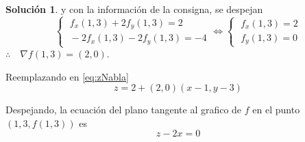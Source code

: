 \documentclass[10pt, a4paper]{report}
\theoremstyle{definition} %
\newtheorem{solution}{Solución}
\begin{document}
\begin{solution}
    y con la información de la consigna, se despejan
    \[\begin{cases}
            \;f_x(1,3) + 2f_y(1,3)=2 \\[5pt]
            \;-2f_x(1,3)- 2f_y(1,3)=-4
        \end{cases}
        \iff
        \begin{cases}
            \;f_x(1,3)=2 \\[5pt]
            \;f_y(1,3)=0
        \end{cases}
    \]
    $\therefore\quad\nabla f(1,3)=(2,0)$.

       Reemplazando en \eqref{eq:zNabla}
      \[
        z= 2 + (2,0)(x-1,y-3)
    \]


        Despejando, la ecuación del plano tangente al grafico de $f$ en el punto $(1,3,f(1,3))$ es
          \[
         z -2x = 0
    \]
 
\newpage
\end{solution}
\end{document}
